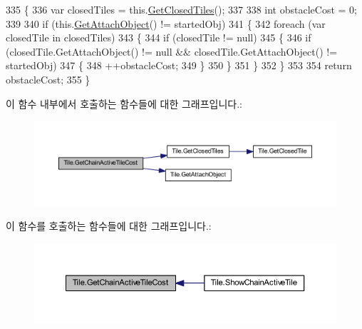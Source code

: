 \begin{DoxyCode}
335     \{
336         var closedTiles = this.\hyperlink{class_tile_a38b9f5c215f16448118e83e0d10aed05}{GetClosedTiles}();
337 
338         \textcolor{keywordtype}{int} obstacleCost = 0;
339 
340         \textcolor{keywordflow}{if} (this.\hyperlink{class_tile_a6c6758ca210a37d98f8e73e87c65f1d2}{GetAttachObject}() != startedObj)
341         \{
342             \textcolor{keywordflow}{foreach} (var closedTile \textcolor{keywordflow}{in} closedTiles)
343             \{
344                 \textcolor{keywordflow}{if} (closedTile != null)
345                 \{
346                     \textcolor{keywordflow}{if} (closedTile.GetAttachObject() != null && closedTile.GetAttachObject() != startedObj)
347                     \{
348                         ++obstacleCost;
349                     \}
350                 \}
351             \}
352         \}
353 
354         \textcolor{keywordflow}{return} obstacleCost;
355     \}
\end{DoxyCode}


이 함수 내부에서 호출하는 함수들에 대한 그래프입니다.\+:\nopagebreak
\begin{figure}[H]
\begin{center}
\leavevmode
\includegraphics[width=350pt]{class_tile_a81b4dd833bdeade289583aabbdcaff73_cgraph}
\end{center}
\end{figure}




이 함수를 호출하는 함수들에 대한 그래프입니다.\+:\nopagebreak
\begin{figure}[H]
\begin{center}
\leavevmode
\includegraphics[width=350pt]{class_tile_a81b4dd833bdeade289583aabbdcaff73_icgraph}
\end{center}
\end{figure}


